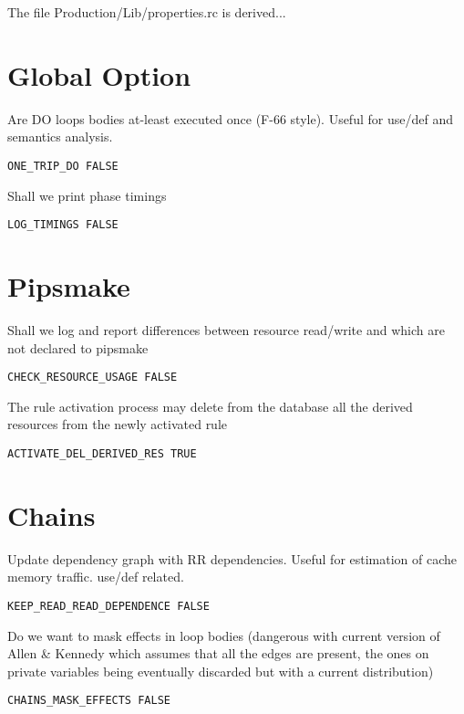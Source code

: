The file Production/Lib/properties.rc is derived...

\section{Global Option}

Are DO loops bodies at-least executed once (F-66 style).
Useful for use/def and semantics analysis.

\begin{verbatim}
ONE_TRIP_DO FALSE
\end{verbatim}

Shall we print phase timings

\begin{verbatim}
LOG_TIMINGS FALSE
\end{verbatim}

\section{Pipsmake}

Shall we log and report differences between resource read/write and
which are not declared to pipsmake

\begin{verbatim}
CHECK_RESOURCE_USAGE FALSE
\end{verbatim}

The rule activation process may delete from the database all the
derived resources from the newly activated rule

\begin{verbatim}
ACTIVATE_DEL_DERIVED_RES TRUE
\end{verbatim}


\section{Chains}

Update dependency graph with RR dependencies.
Useful for estimation of cache memory traffic. use/def related.

\begin{verbatim}
KEEP_READ_READ_DEPENDENCE FALSE
\end{verbatim}

Do we want to mask effects in loop bodies (dangerous with current
version of Allen \& Kennedy which assumes that all the edges are
present, the ones on private variables being eventually discarded
but with a current distribution)

\begin{verbatim}
CHAINS_MASK_EFFECTS FALSE
\end{verbatim}

